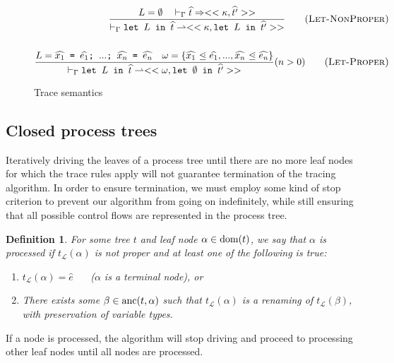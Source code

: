 \documentclass[10pt]{../sigplanconf}
\newcommand{\dom}{\ensuremath{{\rm dom}}}
\newcommand{\anc}{\ensuremath{{\rm anc}}}
\newcommand{\gen}{\ensuremath{~{\leq\kern-6pt \raisebox{1pt}{$\cdot$}}~}}
\newcommand{\nfrac}[2]{\frac{\displaystyle{#1}}{\displaystyle{#2}}}
\newcommand{\tagsc}[1]{\tag{\scshape #1}}
\newtheorem{definition}{Definition}
\begin{document}
\begin{figure*}
  ~\newline

  \begin{align}
    \nfrac{
      L=\emptyset \quad |-_\Gamma \widehat{t} => << \kappa, \widehat{t'} >>
    }{
      |-_\Gamma \texttt{let $L$ in $\widehat{t}$} \rightharpoonup <<\kappa, \texttt{let $L$ in $\widehat{t'}$}>>
    } \tagsc{Let-NonProper}
\\\nonumber\\
    \nfrac{
     L = \texttt{$\widehat{x_1}$ = $\widehat{e_1}$; $...$; $\widehat{x_n}$ = $\widehat{e_n}$}\quad
     \omega = \{ \widehat{x_1} \gen \widehat{e_1}, ..., \widehat{x_n} \gen \widehat{e_n} \}
    }{
      |-_\Gamma \texttt{let $L$ in $\widehat{t}$} \rightharpoonup <<\omega, \texttt{let $\emptyset$ in $\widehat{t'}$} >>
    } (n > 0) \tagsc{Let-Proper}
  \end{align}

  \caption{Trace semantics}
  \label{fig:tracing}
\end{figure*}


\subsection{Closed process trees}
\label{sec:closed_tree}
Iteratively driving the leaves of a process tree until there are no
more leaf nodes for which the trace rules apply will not guarantee
termination of the tracing algorithm. In order to ensure termination,
we must employ some kind of stop criterion to prevent our algorithm
from going on indefinitely, while still ensuring that all possible
control flows are represented in the process tree.
\begin{definition}
  For some tree $t$ and leaf node $\alpha \in \dom(t)$, we say that
  $\alpha$ is \emph{processed} if $t_\mathcal{L}(\alpha)$ is not
  proper and at least one of the following is true:
  \begin{enumerate}
    \item $t_\mathcal{L}(\alpha) = \widehat{e}$ ~~ ($\alpha$ is a terminal node), or
    \item There exists some $\beta \in \anc(t, \alpha)$ such that
      $t_\mathcal{L}(\alpha)$ is a renaming of $t_\mathcal{L}(\beta)$,
      with preservation of variable types.
  \end{enumerate}
\end{definition}
If a node is processed, the algorithm will stop driving and proceed to
processing other leaf nodes until all nodes are processed.
\end{document}
